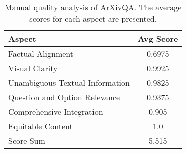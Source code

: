 \begin{table}[t!]
    \centering
    \small 
    \begin{tabular}{@{}lc@{}}
         \toprule
         Aspect & Avg Score \\
         \midrule
        Factual Alignment & 0.6975 \\
        Visual Clarity & 0.9925 \\
        Unambiguous Textual Information & 0.9825 \\
        Question and Option Relevance & 0.9375 \\
        Comprehensive Integration & 0.905 \\
        Equitable Content & 1.0 \\
        \midrule
        Score Sum & 5.515 \\
        \bottomrule
    \end{tabular}
    \caption{Manual quality analysis of ArXivQA. The average scores for each aspect are presented.}
    \label{tab:quality_analysis_ArXivqa_result}
\end{table}